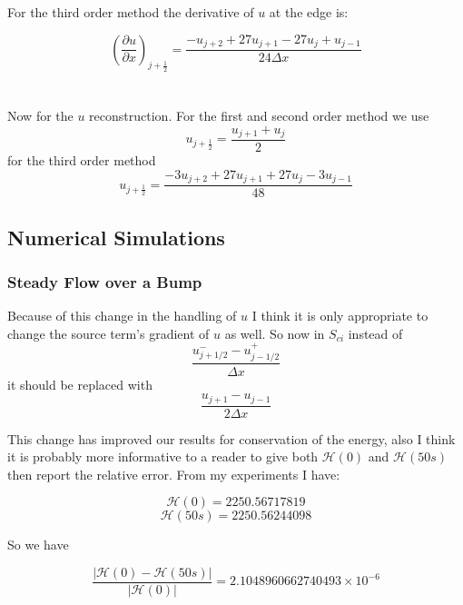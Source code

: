 \documentclass[12pt]{article}
\begin{document}
For the third order method the derivative of $u$ at the edge is:

\[ \left(\frac{\partial u}{\partial x}\right)_{j + \frac{1}{2}} = \frac{-u_{j + 2} + 27u_{j+1} - 27u_{j} + u_{j-1}}{24 \Delta x}\]\\ \\

Now for the $u$ reconstruction.
For the first and second order method we use
\[u_{j + \frac{1}{2}} = \frac{u_{j+1} + u_j}{2}\]
for the third order method
\[u_{j + \frac{1}{2}} = \frac{-3u_{j+2} + 27u_{j+1} + 27u_j - 3u_{j-1}}{48}\]

\subsection{Numerical Simulations}
\subsubsection{Steady Flow over a Bump}
Because of this change in the handling of $u$ I think it is only appropriate to change the source term's gradient of $u$ as well. So now in $S_{ci}$ instead of
\[\frac{u^-_{j + 1/2} - u^+_{j-1/2}}{\Delta x}\]
it should be replaced with 
\[\frac{u_{j + 1} - u_{j-1}}{2 \Delta x}\]

This change has improved our results for conservation of the energy, also I think it is probably more informative to a reader to give both $\mathcal{H}(0)$ and $\mathcal{H}(50s)$ then report the relative error.
From my experiments I have:

\[\mathcal{H}(0) = 2250.56717819\]
\[\mathcal{H}(50s) = 2250.56244098\]

So we have

\[\frac{\left|\mathcal{H}(0) - \mathcal{H}(50s)\right|}{\left|\mathcal{H}(0) \right|} = 2.1048960662740493 \times 10^{-6}\]
\end{document}
